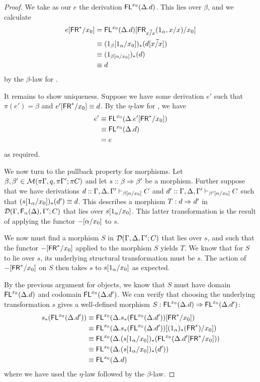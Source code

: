 \begin{proof}
We take as our $e$ the derivation $\mathsf{FL}^{x_0}(\Delta.d)$. This lies over $\beta$, and we calculate
\begin{align*}
e[\mathsf{FR}^*/x_0] &= \mathsf{FL}^{x_0}(\Delta.d)[\mathsf{FR}_{\vec{x/x}}(1_\alpha,{x}/x)/x_0] \\
&\equiv (1_\beta[1_\alpha/x_0])_*(d[\vec{{x}/x}])\\
&\equiv (1_{\beta[\alpha/x_0]})_*(d)\\
&\equiv d
\end{align*}
by the $\beta$-law for . 

It remains to show uniqueness. Suppose we have some derivation $e'$ such that $\pi(e') = \beta$ and $e'[\mathsf{FR}^*/x_0] \equiv d$. By the $\eta$-law for , we have
\begin{align*}
e' &\equiv \mathsf{FL}^{x_0}(\Delta.e'[\mathsf{FR}^*/x_0])\\
&\equiv \mathsf{FL}^{x_0}(\Delta.d)\\
&= e
\end{align*}
as required.

We now turn to the pullback property for morphisms. Let $\beta, \beta' \in \mathcal{M}(\pi\Gamma, q, \pi\Gamma'; \pi C)$ and let $s :: \beta \Rightarrow \beta'$ be a morphism. Further suppose that we have derivations $d :: \Gamma, \Delta, \Gamma' \vdash_{\beta[\alpha/x_0]} C$ and $d' :: \Gamma, \Delta, \Gamma' \vdash_{\beta'[\alpha/x_0]} C$ such that $(s[1_\alpha/x_0])_*(d') \equiv d$. This describes a morphism $T : d \Rightarrow d'$ in $\mathcal{D}(\Gamma,\mathsf{F}_{\alpha}(\Delta),\Gamma';C)$ that lies over $s[1_\alpha/x_0]$. This latter transformation is the result of applying the functor $-[\alpha/x_0]$ to $s$.

We now must find a morphism $S$ in $\mathcal{D}(\Gamma,\Delta,\Gamma';C)$ that lies over $s$, and such that the functor $-[\mathsf{FR}^*/x_0]$ applied to the morphism $S$ yields $T$. We know that for $S$ to lie over $s$, its underlying structural transformation must be $s$. The action of $-[\mathsf{FR}^*/x_0]$ on $S$ then takes $s$ to $s[1_\alpha/x_0]$ as expected.

By the previous argument for objects, we know that $S$ must have domain $\mathsf{FL}^{x_0}(\Delta.d)$ and codomain $\mathsf{FL}^{x_0}(\Delta.d')$. We can verify that choosing the underlying transformation $s$ gives a well-defined morphism $S : \mathsf{FL}^{x_0}(\Delta.d) \Rightarrow \mathsf{FL}^{x_0}(\Delta.d')$:
\begin{align*}
s_*( \mathsf{FL}^{x_0}(\Delta.d')) &\equiv \mathsf{FL}^{x_0}(\Delta.s_*( \mathsf{FL}^{x_0}(\Delta.d'))[\mathsf{FR}^*/x_0])\\
&\equiv \mathsf{FL}^{x_0}(\Delta.s_*( \mathsf{FL}^{x_0}(\Delta.d'))[(1_\alpha)_*(\mathsf{FR}^*)/x_0])\\
&\equiv \mathsf{FL}^{x_0}(\Delta.(s[1_\alpha/x_0])_*( \mathsf{FL}^{x_0}(\Delta.d'[\mathsf{FR}^*/x_0]))\\
&\equiv \mathsf{FL}^{x_0}(\Delta.(s[1_\alpha/x_0])_*(d') )\\
&\equiv \mathsf{FL}^{x_0}(\Delta.d)
\end{align*}
where we have used the $\eta$-law followed by the $\beta$-law. 


\end{proof}
